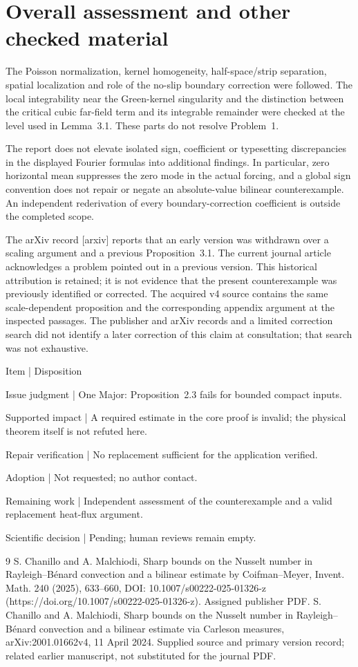 \documentclass[10pt]{article}
\begin{document}
\section*{Overall assessment and other checked material}
The Poisson normalization, kernel homogeneity, half-space/strip separation, spatial localization and role of the no-slip boundary correction were followed. The local integrability near the Green-kernel singularity and the distinction between the critical cubic far-field term and its integrable remainder were checked at the level used in Lemma 3.1. These parts do not resolve Problem 1.\par
The report does not elevate isolated sign, coefficient or typesetting discrepancies in the displayed Fourier formulas into additional findings. In particular, zero horizontal mean suppresses the zero mode in the actual forcing, and a global sign convention does not repair or negate an absolute-value bilinear counterexample. An independent rederivation of every boundary-correction coefficient is outside the completed scope.\par
The arXiv record [arxiv] reports that an early version was withdrawn over a scaling argument and a previous Proposition 3.1. The current journal article acknowledges a problem pointed out in a previous version. This historical attribution is retained; it is not evidence that the present counterexample was previously identified or corrected. The acquired v4 source contains the same scale-dependent proposition and the corresponding appendix argument at the inspected passages. The publisher and arXiv records and a limited correction search did not identify a later correction of this claim at consultation; that search was not exhaustive.\par
Item | Disposition\par
Issue judgment | One Major: Proposition 2.3 fails for bounded compact inputs.\par
Supported impact | A required estimate in the core proof is invalid; the physical theorem itself is not refuted here.\par
Repair verification | No replacement sufficient for the application verified.\par
Adoption | Not requested; no author contact.\par
Remaining work | Independent assessment of the counterexample and a valid replacement heat-flux argument.\par
Scientific decision | Pending; human reviews remain empty.\par
9 S. Chanillo and A. Malchiodi, Sharp bounds on the Nusselt number in Rayleigh–Bénard convection and a bilinear estimate by Coifman–Meyer, Invent. Math. 240 (2025), 633–660, DOI: 10.1007/s00222-025-01326-z (https://doi.org/10.1007/s00222-025-01326-z). Assigned publisher PDF. S. Chanillo and A. Malchiodi, Sharp bounds on the Nusselt number in Rayleigh–Bénard convection and a bilinear estimate via Carleson measures, arXiv:2001.01662v4, 11 April 2024. Supplied source and primary version record; related earlier manuscript, not substituted for the journal PDF.\par
\end{document}
